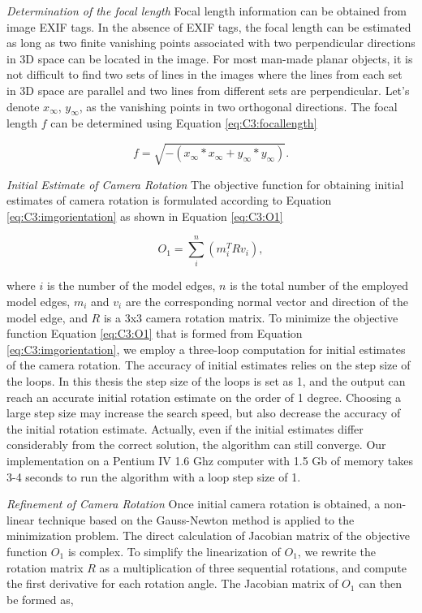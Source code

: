 {\it Determination of the focal length} Focal length information can be obtained from image EXIF tags. In the absence of EXIF tags, the focal length can be estimated as long as two finite vanishing points associated with two perpendicular directions in 3D space can be located in the image. For most man-made planar objects, it is not difficult to find two sets of lines in the images where the lines from each set in 3D space are parallel and two lines from different sets are perpendicular. Let’s denote $x_{\infty}$, $y_{\infty}$, as the vanishing points in two orthogonal directions. The focal length $f$ \cite{Caprile90} can be determined using Equation \ref{eq:C3:focallength}

\begin{equation}
   f = \sqrt{-(x_{\infty}*x_{\infty} + y_{\infty}*y_{\infty})}.
\label{eq:C3:focallength}
\end{equation} 

{\it Initial Estimate of Camera Rotation} The objective function for obtaining initial estimates of camera rotation is formulated according to Equation \ref{eq:C3:imgorientation} as shown in  Equation \ref{eq:C3:O1} 

\begin{equation}
   O_1 = \sum_i^n(m_i^TRv_i),
\label{eq:C3:O1}
\end{equation}      

where $i$ is the number of the model edges, $n$ is the total number of the employed model edges, $m_i$ and $v_i$ are the corresponding normal vector and direction of the model edge, and $R$ is a 3x3 camera rotation matrix. To minimize the objective function Equation \ref{eq:C3:O1} that is formed from Equation \ref{eq:C3:imgorientation}, we employ a three-loop computation for initial estimates of the camera rotation. The accuracy of initial estimates relies on the step size of the loops. In this thesis the step size of the loops is set as 1, and the output can reach an accurate initial rotation estimate on the order of 1 degree. Choosing a large step size may increase the search speed, but also decrease the accuracy of the initial rotation estimate. Actually, even if the initial estimates differ considerably from the correct solution, the algorithm can still converge. Our implementation on a Pentium IV 1.6 Ghz computer with 1.5 Gb of memory takes 3-4 seconds to run the algorithm with a loop step size of 1.  

{\it Refinement of Camera Rotation} Once initial camera rotation is obtained, a non-linear technique based on the Gauss-Newton method is applied to the minimization problem. The direct calculation of Jacobian matrix of the objective function $O_1$ is complex. To simplify the linearization of $O_1$, we rewrite the rotation matrix $R$ as a multiplication of three sequential rotations, and compute the first derivative for each rotation angle. The Jacobian matrix of $O_1$ can then be formed as,

